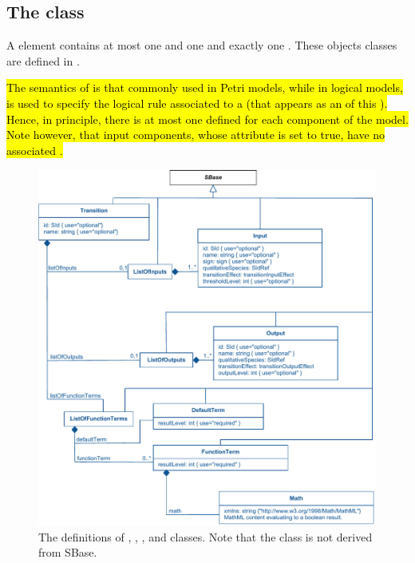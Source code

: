 \subsection{The  class}
\label{transitions-class}
A \Transition element contains at most one \ListOfInputs and one \ListOfOutputs and exactly one \ListOfFunctionTerms. These objects classes are defined in .

\hl{The semantics of \Transition is that commonly used in Petri models, while in logical models, \Transition is used to specify the logical rule associated to a \QualitativeSpecies (that appears as an \Input of this \Transition). Hence, in principle, there is at most one \Transition defined for each component of the model. Note however, that input components, whose  attribute is set to true, have no associated \Transition. }

\begin{figure}
  \includegraphics{figs/qual-transition-uml.pdf}
  \caption{The definitions of \Transition, \Input, \Output, \DefaultTerm and \FunctionTerm classes. Note that the \DefaultTerm class is not derived from SBase. }
  \label{qual-transition-uml}
\end{figure}

